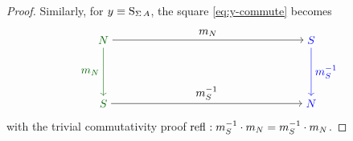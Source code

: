 \documentclass[english,a4paper]{lmcs}
\begin{document}
\begin{proof}
	Similarly, for $y \equiv \mathrm{S}_{\operatorname{\Sigma} A}$, the square \eqref{eq:y-commute} becomes
	\begin{equation}\label{eq:S-commute}
	\begin{tikzpicture}[x=6.5cm,y=-2cm,baseline=(current bounding box.center)]
	\node[text=darkgreen] (N1) at (0,0) {$N$};
	\node[text=darkgreen] (S1) at (0,1) {$S$};
	\node[text=darkblue] (S2) at (1,0) {$S$};
	\node[text=darkblue] (N2) at (1,1) {$N$};
	\draw[->,text=darkgreen,color=darkgreen] (N1) to node[left] {$m_N$} (S1);
        \draw[->,text=darkblue,color=darkblue] (S2) to node[right] {$\inv{m_S}$} (N2);
	\draw[->] (N1) to node[above] {$m_N$} (S2);
        \draw[->] (S1) to node[above] {$\inv{m_S}$} (N2);
	\end{tikzpicture}
	\end{equation}
        with the trivial commutativity proof $\mathop{{\mathrm{refl}}_{}} : m_S^{-1} \cdot {m_N} = m_S^{-1} \cdot m_N$.


\end{proof}
\end{document}
